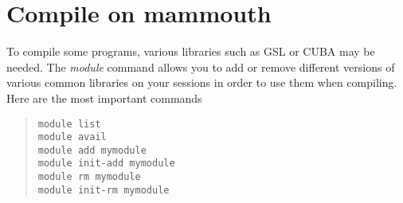 \documentclass[10pt,letter]{article}
\begin{document}
\section{Compile on mammouth}

To compile some programs, various libraries such as GSL or CUBA may be needed. The \emph{module} command allows you to  add or remove different versions of various common libraries on your sessions in order to use them when compiling. Here are the most important commands
\begin{quote}
\begin{verbatim}
module list
module avail
module add mymodule
module init-add mymodule
module rm mymodule
module init-rm mymodule
\end{verbatim}
\end{quote}
\end{document}
